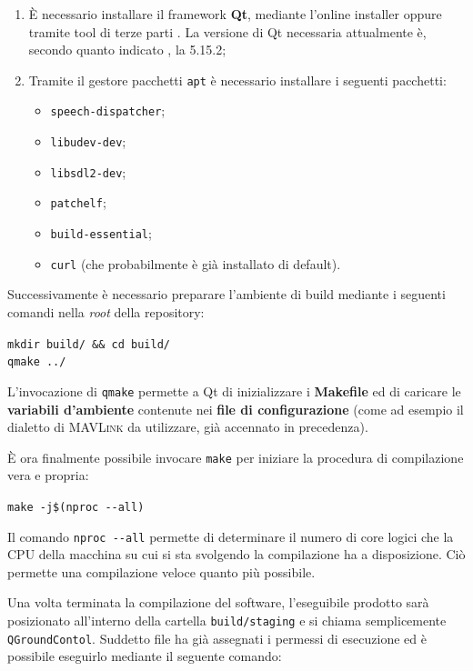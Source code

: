 \documentclass[a4paper, 12pt, oneside]{article}
\theoremstyle{definition}
\begin{document}
\begin{enumerate}
    \item È necessario installare il framework \textbf{Qt}, mediante l'online installer oppure tramite tool di terze parti \cite{aqtinstall}. La versione di Qt necessaria attualmente è, secondo quanto indicato \cite{build-qgc}, la 5.15.2;
    \item Tramite il gestore pacchetti \texttt{apt} è necessario installare i seguenti pacchetti:
        \begin{itemize}
            \item \texttt{speech-dispatcher};
            \item \texttt{libudev-dev};
            \item \texttt{libsdl2-dev};
            \item \texttt{patchelf};
            \item \texttt{build-essential};
            \item \texttt{curl} (che probabilmente è già installato di default).
        \end{itemize}
\end{enumerate}

Successivamente è necessario preparare l'ambiente di build mediante i seguenti comandi nella \textit{root} della repository:

\begin{center}
    \texttt{mkdir build/ \&\& cd build/} \\
    \texttt{qmake ../}
\end{center}

L'invocazione di \texttt{qmake} permette a Qt di inizializzare i \textbf{Makefile} ed di caricare le \textbf{variabili d'ambiente} contenute nei \textbf{file di configurazione} (come ad esempio il dialetto di \textsc{MAVLink} da utilizzare, già accennato in precedenza).

È ora finalmente possibile invocare \texttt{make} per iniziare la procedura di compilazione vera e propria:

\begin{center}
    \texttt{make -j\$(nproc -{}-all)}
\end{center}

Il comando \texttt{nproc -{}-all} permette di determinare il numero di core logici che la CPU della macchina su cui si sta svolgendo la compilazione ha a disposizione. Ciò permette una compilazione veloce quanto più possibile.

Una volta terminata la compilazione del software, l'eseguibile prodotto sarà posizionato all'interno della cartella \texttt{build/staging} e si chiama semplicemente \texttt{QGroundContol}. Suddetto file ha già assegnati i permessi di esecuzione ed è possibile eseguirlo mediante il seguente comando:
\end{document}
